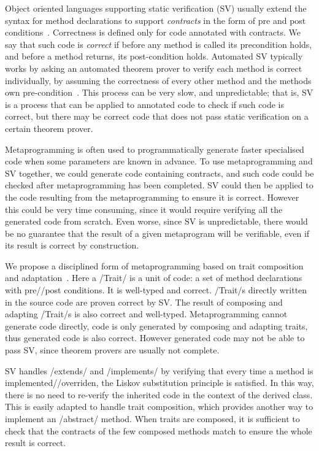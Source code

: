 \noindent Object oriented languages supporting static verification (SV) usually extend the syntax for method declarations
to support \emph{contracts} in the form of pre and post conditions~\cite{Meyer:1988:OSC:534929}.
Correctness is defined only for code annotated with contracts.
We say that such code is \emph{correct} if 
before any method is called its precondition holds, and before a method returns, its post-condition holds.
Automated SV typically works by asking an automated theorem prover to verify each method is correct individually, by assuming the correctness of every other method and the methods own pre-condition~\cite{barnett2004spec}. This process can be very slow, and unpredictable;
that is, SV is a process that can be applied to annotated code
to check if such code is correct, but there may be correct code that does not pass static verification
 on a certain theorem prover.

Metaprogramming is often used to programmatically generate faster specialised code 
when some parameters are known in advance. %
To use metaprogramming and SV together, we could generate code
containing contracts, and such code could be checked after metaprogramming has been completed.
SV could then be applied to the code resulting from the metaprogramming to ensure it is correct.
However this could be very time consuming, since it would require verifying all the generated code from scratch.
Even worse, since SV is unpredictable, there would be no guarantee that the result of a given metaprogram will be verifiable, even if its result is correct by construction.

We propose a disciplined form of metaprogramming based on trait composition and adaptation~\cite{scharli2003traits,servetto2014meta}.
Here a /Trait/ is a unit of code: a set of method declarations with pre//post conditions. It is well-typed and correct.
/Trait/s directly written in the source code
are proven correct by SV.
The result of composing and adapting /Trait/s is also correct and well-typed.
Metaprogramming cannot generate code directly, code is only generated by composing and adapting traits, thus generated code is also correct.
However generated code may not be able to pass SV, since theorem provers are usually not complete.

SV handles /extends/ and /implements/ by verifying that every 
time a method is implemented//overriden, 
the Liskov substitution principle is satisfied. In this way, there is no need to re-verify
the inherited code in the context of the derived class.
This is easily adapted
to handle trait composition, which provides another way to implement an /abstract/ method.
When traits are composed,
it is sufficient
to check that the contracts of the few composed methods match 
to ensure the whole result is correct.

